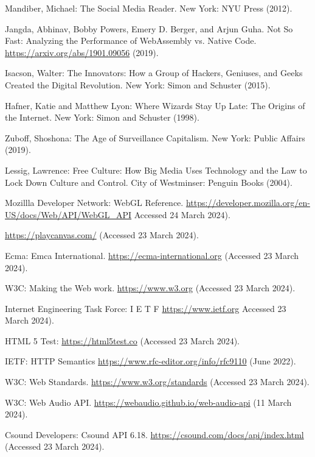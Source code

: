\documentclass[runningheads,a4paper]{llncs}
\begin{document}
\begin{thebibliography}{4}

 Mandiber, Michael: The Social Media Reader. New York: NYU Press (2012).

 Jangda, Abhinav, Bobby Powers, Emery D. Berger, and Arjun Guha. Not So Fast: Analyzing the Performance of WebAssembly vs. Native Code. \url{https://arxiv.org/abs/1901.09056} (2019).

 Isacson, Walter: The Innovators: How a Group of Hackers, Geniuses, and Geeks Created the Digital Revolution. New York: Simon and Schuster (2015).

 Hafner, Katie and Matthew Lyon: Where Wizards Stay Up Late: The Origins of the Internet. New York: Simon and Schuster (1998).

 Zuboff, Shoshona: The Age of Surveillance Capitalism. New York: Public Affairs (2019).

 Lessig, Lawrence: Free Culture: How Big Media Uses Technology and the Law to Lock Down Culture and Control. City of Westminser: Penguin Books (2004).

 Mozillla Developer Network: WebGL Reference. \url{https://developer.mozilla.org/en-US/docs/Web/API/WebGL_API} Accessed 24 March 2024).

 \url{https://playcanvas.com/} (Accessed 23 March 2024).

 Ecma: Emca International. \url{https://ecma-international.org} (Accessed 23 March 2024).

 W3C: Making the Web work. \url{https://www.w3.org} (Accessed 23 March 2024).

 Internet Engineering Task Force: I E T F \url{https://www.ietf.org} Accessed 23 March 2024).

 HTML 5 Test: \url{https://html5test.co} (Accessed 23 March 2024).

 IETF: HTTP Semantics \url{https://www.rfc-editor.org/info/rfc9110} (June 2022).

 W3C: Web Standards. \url{https://www.w3.org/standards} (Accessed 23 March 2024).

 W3C: Web Audio API. \url{https://webaudio.github.io/web-audio-api} (11 March 2024).

 Csound Developers: Csound API 6.18. \url{https://csound.com/docs/api/index.html} (Accessed 23 March 2024).


\end{thebibliography}
\end{document}
